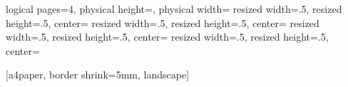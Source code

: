 {	
	{
	  \edef\pgfpageoptionheight{\the\paperheight} 
	  \edef\pgfpageoptionwidth{\the\paperwidth}
	  \edef\pgfpageoptionborder{0pt}
	}
	{
	  \pgfpagesphysicalpageoptions
	  {%
	    logical pages=4,%
	    physical height=\pgfpageoptionheight,%
	    physical width=\pgfpageoptionwidth%
	  }
	  {%
	    resized width=.5\pgfphysicalwidth,%
	    resized height=.5\pgfphysicalheight,%
	    center=\pgfpoint{.25\pgfphysicalwidth}{.75\pgfphysicalheight}%
	  }%
	  {%
	    resized width=.5\pgfphysicalwidth,%
	    resized height=.5\pgfphysicalheight,%
	    center=\pgfpoint{.75\pgfphysicalwidth}{.75\pgfphysicalheight}%
	  }%
	  {%
	    resized width=.5\pgfphysicalwidth,%
	    resized height=.5\pgfphysicalheight,%
	    center=\pgfpoint{.25\pgfphysicalwidth}{.25\pgfphysicalheight}%
	  }%
	  {%
	    resized width=.5\pgfphysicalwidth,%
	    resized height=.5\pgfphysicalheight,%
	    center=\pgfpoint{.75\pgfphysicalwidth}{.25\pgfphysicalheight}%
	  }%
	}


  [a4paper, border shrink=5mm, landscape]
  \nofiles
}





\newcommand{\hkapitola}[1]{
\section{#1}
\begin{frame}
\begin{block}{}
\Huge
\centering
#1
\end{block}
\end{frame}
}

\newcommand{\kapitola}[1]{
\subsection{#1}
\begin{frame}
\begin{block}{}
\Large
\centering
#1
\end{block}
\end{frame}
}

